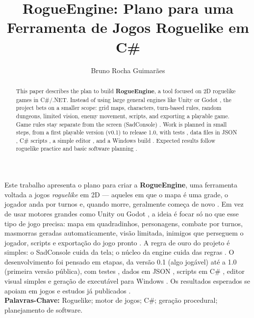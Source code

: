\documentclass[12pt]{article}
\title{RogueEngine: Plano para uma Ferramenta de Jogos Roguelike em C\#}
\author{Bruno Rocha Guimarães\inst{1}}
\begin{document}
\maketitle

\begin{abstract}
This paper describes the plan to build \textbf{RogueEngine}, a tool focused on
2D roguelike games in C\#/.NET. Instead of using large general engines like Unity or
Godot \citep{unity2024,godot2024}, the project bets on a smaller scope: grid maps,
characters, turn-based rules, random dungeons, limited vision, enemy movement, scripts,
and exporting a playable game. Game rules stay separate from the screen (SadConsole)
\citep{sadconsole2024,gregory2018,martin2017}. Work is planned in small steps, from a
first playable version (v0.1) to release 1.0, with tests \citep{xunit2024}, data files in
JSON \citep{jsonschema2024}, C\# scripts \citep{roslyn2024}, a simple editor
\citep{avalonia2024}, and a Windows build \citep{netpublish2024}. Expected results follow
roguelike practice \citep{berlin2008,wild2018,dcss2023} and basic software planning
\citep{sommerville2015,boehm1988,beck2001}.
\end{abstract}

\begin{resumo}
Este trabalho apresenta o plano para criar a \textbf{RogueEngine}, uma ferramenta voltada
a jogos \textit{roguelike} em 2D --- aqueles em que o mapa é uma grade, o jogador anda por
turnos e, quando morre, geralmente começa de novo \citep{berlin2008}. Em vez de usar motores
grandes como Unity ou Godot \citep{unity2024,godot2024}, a ideia é focar só no que esse tipo
de jogo precisa: mapa em quadradinhos, personagens, combate por turnos, masmorras geradas
automaticamente, visão limitada, inimigos que perseguem o jogador, scripts e exportação do
jogo pronto \citep{hendrikx2013,togelius2016}. A regra de ouro do projeto é simples: o
SadConsole cuida da tela; o núcleo da engine cuida das regras \citep{sadconsole2024,martin2017,
gregory2018}. O desenvolvimento foi pensado em etapas, da versão 0.1 (algo jogável) até a
1.0 (primeira versão pública), com testes \citep{xunit2024}, dados em JSON
\citep{jsonschema2024}, scripts em C\# \citep{roslyn2024}, editor visual simples
\citep{repenning2017,avalonia2024} e geração de executável para Windows
\citep{netpublish2024}. Os resultados esperados se apoiam em jogos e estudos já publicados
\citep{craddock2015,wild2018,dcss2023,pressman2014,sommerville2015,boehm1988}.\\
\textbf{Palavras-Chave:} Roguelike; motor de jogos; C\#; geração procedural; planejamento de software.
\end{resumo}
\end{document}
